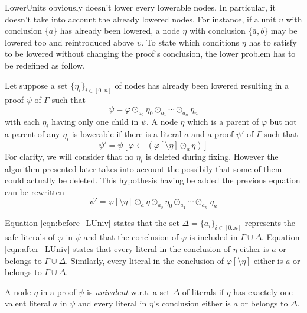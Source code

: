 \documentclass{llncs}
\newcommand{\dual}[1]{{\ensuremath{\bar{#1}}}}
\begin{document}
LowerUnits obviously doesn't lower every lowerable nodes. In particular, it doesn't take into
account the already lowered nodes. For instance, if a unit $\upsilon$ with conclusion $\{a\}$ has already been
lowered, a node $\eta$ with conclusion $\{\dual{a},b\}$ may be lowered too and reintroduced above
$\upsilon$. To state which conditions $\eta$ has to satisfy to be lowered without changing the
proof's conclusion, the lower problem has to be redefined as follow.

Let suppose a set $\{\eta_i\}_{i \in [0..n]}$ of nodes has already been lowered resulting in a proof
$\psi$ of $\Gamma$ such that
\begin{equation} \label{eqn:before_LUniv}
  \psi = \varphi \odot_{a_0} \eta_0 \odot_{a_1} \cdots \odot_{a_n} \eta_n
\end{equation}
with each $\eta_i$ having only one child in $\psi$. A node $\eta$ which is a parent of $\varphi$ but
not a parent of any $\eta_i$ is lowerable if there is a literal $a$ and a proof $\psi'$ of
$\Gamma$ such that
\begin{equation}
  \psi' = \psi[\varphi \leftarrow (\varphi[\setminus \eta] \odot_a \eta)]
\end{equation}
For clarity, we will consider that no $\eta_i$ is deleted during fixing. However the algorithm
presented later takes into account the possibily that some of them could actually be deleted. This
hypothesis having be added the previous equation can be rewritten
\begin{equation} \label{eqn:after_LUniv}
  \psi' = \varphi[\setminus \eta] \odot_a \eta \odot_{a_0} \eta_0 \odot_{a_1} \cdots \odot_{a_n} \eta_n
\end{equation}

Equation \ref{eqn:before_LUniv} states that the set $\Delta = \{\dual{a_i}\}_{i \in [0..n]}$
represents the safe literals of $\varphi$ in $\psi$ and that the conclusion of $\varphi$ is included
in $\Gamma \cup \Delta$. Equation \ref{eqn:after_LUniv} states that every literal in the conclusion
of $\eta$ either is $a$ or belongs to $\Gamma \cup \Delta$. Similarly, every literal in the
conclusion of $\varphi[\setminus \eta]$ either is $\dual{a}$ or belongs to $\Gamma \cup \Delta$.

\begin{definition}
A node $\eta$ in a proof $\psi$ is \emph{univalent} w.r.t. a set $\Delta$ of literals if $\eta$ has
exactely one valent literal $a$ in $\psi$ and every literal in $\eta$'s conclusion either is $a$ or
belongs to $\Delta$.
\end{definition}
\end{document}
